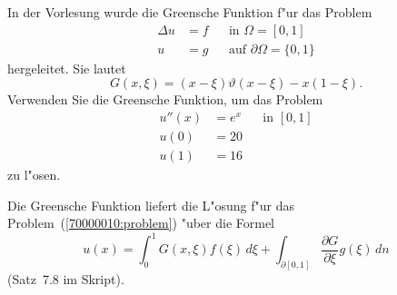 In der Vorlesung wurde die Greensche Funktion f"ur das Problem
\[
\begin{aligned}
\Delta u&= f & &\text{in $\Omega = [0,1]$}\\
       u&= g & &\text{auf $\partial\Omega = \{0,1\}$}
\end{aligned}
\]
hergeleitet.
Sie lautet 
\[
G(x,\xi) = (x-\xi)\vartheta(x-\xi) -x(1-\xi).
\]
Verwenden Sie die Greensche Funktion, um das Problem
\[
\begin{aligned}
u''(x)& = e^x& &\text{in $[0,1]$}\\
  u(0)& =  20& &\\
  u(1)& =  16& &
\end{aligned}
\label{70000010:problem}
\]
zu l"osen.

\begin{loesung}
Die Greensche Funktion liefert die L"osung f"ur das
Problem~(\ref{70000010:problem}) "uber die Formel
\begin{equation}
u(x)
=
\int_0^1 G(x,\xi) f(\xi)\,d\xi
+
\int_{\partial[0,1]}\frac{\partial G}{\partial \xi} g(\xi)\,dn
\label{70000010:green}
\end{equation}
(Satz~7.8 im Skript). 


\end{loesung}
